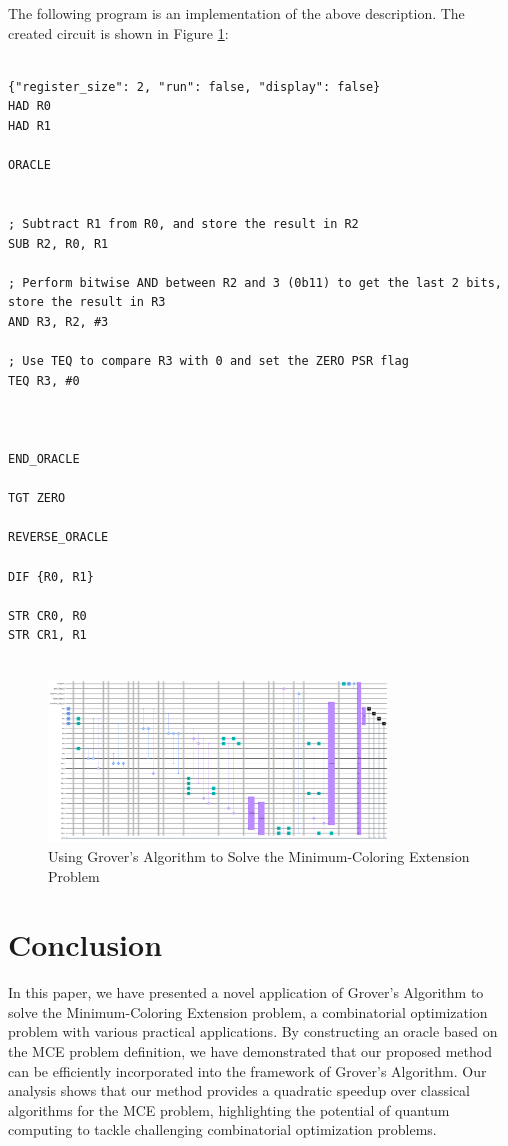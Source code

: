 The following program is an implementation of the above description. The created circuit is shown in Figure \ref{fig:Minimum-Coloring_Extension}:

\begin{lstlisting}

{"register_size": 2, "run": false, "display": false}
HAD R0
HAD R1

ORACLE


; Subtract R1 from R0, and store the result in R2
SUB R2, R0, R1

; Perform bitwise AND between R2 and 3 (0b11) to get the last 2 bits, store the result in R3
AND R3, R2, #3

; Use TEQ to compare R3 with 0 and set the ZERO PSR flag
TEQ R3, #0



END_ORACLE

TGT ZERO

REVERSE_ORACLE

DIF {R0, R1}

STR CR0, R0
STR CR1, R1


\end{lstlisting}

\begin{figure}[htp]
    \centering
    \includegraphics[width=9cm]{Figures/Minimum-Coloring_Extension_circuit.png}
    \caption{Using Grover's Algorithm to Solve the Minimum-Coloring Extension Problem}
    \label{fig:Minimum-Coloring_Extension}
\end{figure}

\section{Conclusion}
\label{sec:conclusion}

In this paper, we have presented a novel application of Grover's Algorithm to solve the Minimum-Coloring Extension problem, a combinatorial optimization problem with various practical applications. By constructing an oracle based on the MCE problem definition, we have demonstrated that our proposed method can be efficiently incorporated into the framework of Grover's Algorithm. Our analysis shows that our method provides a quadratic speedup over classical algorithms for the MCE problem, highlighting the potential of quantum computing to tackle challenging combinatorial optimization problems.

